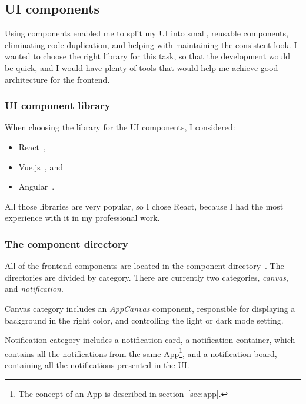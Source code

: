 \subsection{UI components}\label{sec:ui-components}

Using components enabled me to split my UI
into small, reusable components,
eliminating code duplication,
and helping with maintaining the consistent look.
I wanted to choose the right library
for this task,
so that the development would be quick,
and I would have plenty of tools
that would help me achieve
good architecture for the frontend.

\subsubsection{UI component library}\label{sec:ui-component-library}

When choosing the library for the UI components, I considered:

\begin{itemize}
  \item
        React~\cite{oshannessy_react_2022},
  \item
        Vue.js~\cite{you_vuejs_2022}, and
  \item
        Angular~\cite{kalpakas_angular_2022}.
\end{itemize}

All those libraries are very popular,
so I chose React,
because I had the most experience with it in my professional work.

\subsubsection{The component directory}\label{sec:the-component-directory}

All of the frontend components
are located in the component directory~\cite{sewera_notipie_2022-3}.
The directories are divided by category.
There are currently two categories,
\emph{canvas}, and
\emph{notification}.

Canvas category includes
an \emph{AppCanvas} component,
responsible for displaying
a background in the right color,
and controlling the light or dark mode setting.

Notification category includes
a notification card,
a notification container,
which contains all the notifications
from the same App\footnote{
  The concept of an App is described
  in section~\ref{sec:app}.
}, and a notification board,
containing all the notifications
presented in the UI.

